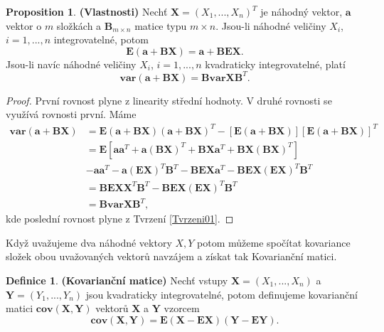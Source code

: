 \documentclass[a4]{report}
\theoremstyle{definition}
\newtheorem{definition}{Definice}[section]
\newtheorem{proposition}{Proposition}[section]
\begin{document}
{\begin{proposition}{\textbf{(Vlastnosti)}}
Nechť $\textbf{X} = (X_{1}, ..., X_{n})^{T}$ je náhodný vektor, $\textbf{a}$ vektor o $m$ složkách a $\textbf{B}_{m \times n}$ matice typu $m \times n$. Jsou-li náhodné veličiny $X_{i}$, $i = 1, ..., n$ integrovatelné, potom
\begin{equation}
\mathbf{E}(\textbf{a} + \textbf{B}\textbf{X}) = \textbf{a}+ \textbf{B}\mathbf{E}\textbf{X}.
\end{equation}
Jsou-li navíc náhodné veličiny $X_{i}$, $i = 1, ..., n$ kvadraticky integrovatelné, platí
\begin{equation}
\mathbf{var}(\textbf{a} + \textbf{B}\textbf{X}) = \textbf{B}\mathbf{var}\textbf{X}\textbf{B}^{T}.
\end{equation}
\end{proposition}
\begin{proof}
První rovnost plyne z linearity střední hodnoty. V druhé rovnosti se využívá rovnosti první. Máme
\begin{align*}
\mathbf{var}(\textbf{a} + \textbf{B}\textbf{X}) &= \mathbf{E}(\textbf{a} + \textbf{B}\textbf{X})(\textbf{a} + \textbf{B}\textbf{X})^{T} - [\mathbf{E}(\textbf{a} + \textbf{B}\textbf{X})][\mathbf{E}(\textbf{a} + \textbf{B}\textbf{X})]^{T} \\
&=\mathbf{E}[ \textbf{a}\textbf{a}^{T} + \textbf{a}(\textbf{B}\textbf{X})^{T} + \textbf{B}\textbf{X}\textbf{a}^{T} + \textbf{B}\textbf{X}(\textbf{B}\textbf{X})^{T}] \\
&- \textbf{a}\textbf{a}^{T} - \textbf{a}(\mathbf{E}\textbf{X})^{T} \textbf{B}^{T}- \textbf{B}\mathbf{E}\textbf{X}\textbf{a}^{T} - \textbf{B}\mathbf{E}\textbf{X}(\mathbf{E}\textbf{X})^{T}\textbf{B}^{T} \\
&= \textbf{B}\mathbf{E}\textbf{X}\textbf{X}^{T}\textbf{B}^{T} - \textbf{B}\mathbf{E}\textbf{X}(\mathbf{E}\textbf{X})^{T}\textbf{B}^{T} \\
&= \textbf{B}\mathbf{var}\textbf{X}\textbf{B}^{T},
\end{align*}
kde poslední rovnost plyne z Tvrzení \ref{Tvrzeni01}.
\end{proof}

Když uvažujeme dva náhodné vektory $X, Y$ potom můžeme spočítat kovariance složek obou uvažovaných vektorů navzájem a získat tak Kovarianční matici.
\begin{definition}{\textbf{(Kovarianční matice)}}
Nechť vstupy $\textbf{X} = (X_{1}, ..., X_{n})$ a $\textbf{Y} = (Y_{1}, ..., Y_{n})$ jsou kvadraticky integrovatelné, potom definujeme kovarianční matici $\textbf{cov}(\textbf{X}, \textbf{Y})$ vektorů $\textbf{X}$ a $\textbf{Y}$ vzorcem
\begin{equation}
\mathbf{cov}(\textbf{X}, \textbf{Y}) = \mathbf{E}(\textbf{X}- \mathbf{E}\textbf{X})(\textbf{Y}- \mathbf{E}\textbf{Y}).
\end{equation}
\end{definition}

}
\end{document}

